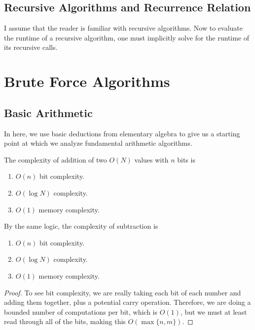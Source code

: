 \documentclass{article}
\begin{document}
  \subsection{Recursive Algorithms and Recurrence Relation}

    I assume that the reader is familiar with recursive algorithms. Now to evaluate the runtime of a recursive algorithm, one must implicitly solve for the runtime of its recursive calls. 

\section{Brute Force Algorithms} 

  \subsection{Basic Arithmetic}

    In here, we use basic deductions from elementary algebra to give us a starting point at which we analyze fundamental arithmetic algorithms. 

    \begin{theorem}
      The complexity of addition of two $O(N)$ values with $n$ bits is
      \begin{enumerate}
        \item $O(n)$ bit complexity. 
        \item $O(\log N)$ complexity. 
        \item $O(1)$ memory complexity. 
      \end{enumerate}
      By the same logic, the complexity of subtraction is 
      \begin{enumerate}
        \item $O(n)$ bit complexity. 
        \item $O(\log N)$ complexity. 
        \item $O(1)$ memory complexity. 
      \end{enumerate}
    \end{theorem}
    \begin{proof}
      To see bit complexity, we are really taking each bit of each number and adding them together, plus a potential carry operation. Therefore, we are doing a bounded number of computations per bit, which is $O(1)$, but we must at least read through all of the bits, making this $O(\max\{n, m\})$. 
    \end{proof}
\end{document}
